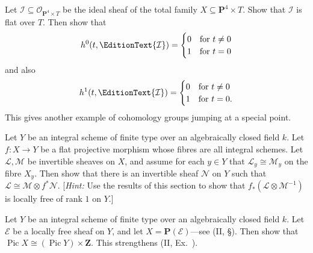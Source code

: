 {Let $\mathcal I\subseteq\mathcal O_{\mathbf P^4\times T}$ be the ideal sheaf of the total family $X\subseteq\mathbf P^4\times T$. Show that $\mathcal I$ is flat over $T$. Then show that
\[
 h^0(t,\EditionText{\mathcal I})=
 \begin{cases}0&\text{for }t\ne0\\1&\text{for }t=0\end{cases}
\]
and also
\[
 h^1(t,\EditionText{\mathcal I})=
 \begin{cases}0&\text{for }t\ne0\\1&\text{for }t=0.\end{cases}
\]
This gives another example of cohomology groups jumping at a special point.

 Let $Y$ be an integral scheme of finite type over an algebraically closed field $k$. Let $f\colon X\to Y$ be a flat projective morphism whose fibres are all integral schemes. Let $\mathcal L,\mathcal M$ be invertible sheaves on $X$, and assume for each $y\in Y$ that $\mathcal L_y\cong\mathcal M_y$ on the fibre $X_y$. Then show that there is an invertible sheaf $\mathcal N$ on $Y$ such that $\mathcal L\cong\mathcal M\otimes f^*\mathcal N$. [\emph{Hint:} Use the results of this section to show that $f_*(\mathcal L\otimes\mathcal M^{-1})$ is locally free of rank $1$ on $Y$.]

 Let $Y$ be an integral scheme of finite type over an algebraically closed field $k$. Let $\mathcal E$ be a locally free sheaf\EditionText{} on $Y$, and let $X=\mathbf P(\mathcal E)$---see (II, \S{}). Then show that $\operatorname{Pic}X\cong(\operatorname{Pic}Y)\times\mathbf Z$. This strengthens (II, Ex.~).
}
